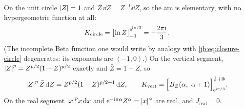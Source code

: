 On the unit circle ${|Z|} = 1$ and $\bar Z \, \dd Z = Z^{-1} \dd Z$, so the arc is elementary,
with no hypergeometric function at all:
\begin{equation}
  \label{jb:eq:closure-circle-q-zero}
  K_{\text{circle}}
    = \bigl[ \ln Z \bigr]_{-1}^{\mathrm{e}^{\mathrm{i} \pi/3}}
    = - \frac{2 \pi \mathrm{i}}{3} .
\end{equation}
(The incomplete Beta function one would write by analogy with \eqref{jb:eq:closure-circle}
degenerates: its exponents are $(-1, 0)$.)
On the vertical segment, ${|Z|}^{p} = Z^{p/2} (1 - Z)^{p/2}$ exactly and $\bar Z = 1 - Z$, so
\begin{equation}
  \label{jb:eq:closure-vert-q-zero}
  {|Z|}^{p} \, \bar Z \, \mathrm{d} Z
    = Z^{p/2} (1 - Z)^{p/2 + 1} \, \mathrm{d} Z,
  \qquad
  K_{\text{vert}}
    = \Bigl[ B_Z (\alpha, \ \alpha + 1) \Bigr]_{\mathrm{e}^{\mathrm{i} \pi/3}}^{\frac12 + \mathrm{i} b} .
\end{equation}
On the real segment ${|x|}^{p} x \, \mathrm{d} x$ and $\mathrm{e}^{-\mathrm{i} \pi \alpha} Z^{\alpha} = {|x|}^{\alpha}$
are real, and $J_{\text{real}} = 0$.

